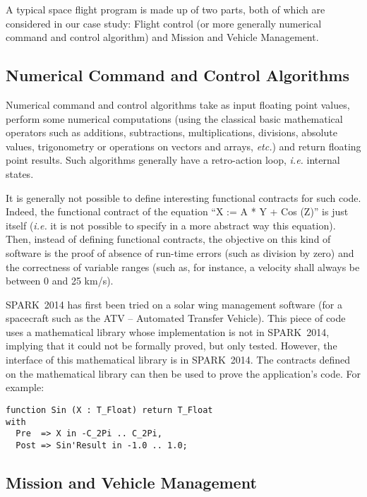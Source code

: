 \documentclass[10pt,a4paper,twocolumn]{article}
\newcommand{\newspark}{SPARK~2014\xspace}
\newcommand{\etc}{\textit{etc.}\xspace}
\newcommand{\ie}{\textit{i.e.}\xspace}
\begin{document}
A typical space flight program is made up of two parts, both of which
are considered in our case study: Flight control (or more generally
numerical command and control algorithm) and Mission and Vehicle
Management.

\subsection{Numerical Command and Control Algorithms}

Numerical command and control algorithms take as input floating point
values, perform some numerical computations (using the classical basic
mathematical operators such as additions, subtractions,
multiplications, divisions, absolute values, trigonometry or
operations on vectors and arrays, \etc) and return floating point
results. Such algorithms generally have a retro-action loop, \ie
internal states.

It is generally not possible to define interesting functional
contracts for such code. Indeed, the functional contract of the
equation ``X := A * Y + Cos (Z)'' is just itself (\ie it is not
possible to specify in a more abstract way this equation). Then,
instead of defining functional contracts, the objective on this kind
of software is the proof of absence of run-time errors (such as
division by zero) and the correctness of variable ranges (such as, for
instance, a velocity shall always be between 0 and 25 km/s).

\newspark has first been tried on a solar wing management
software (for a spacecraft such as the ATV -- Automated Transfer
Vehicle). This piece of code uses a mathematical library whose
implementation is not in \newspark, implying that it could not be
formally proved, but only tested. However, the interface of this
mathematical library is in \newspark. The contracts defined on the
mathematical library can then be used to prove the application's
code. For example:

\begin{lstlisting}
function Sin (X : T_Float) return T_Float
with
  Pre  => X in -C_2Pi .. C_2Pi,
  Post => Sin'Result in -1.0 .. 1.0;
\end{lstlisting}

\subsection{Mission and Vehicle Management}
\end{document}
